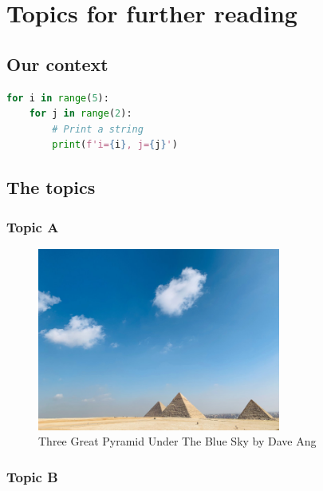 \chapter{Topics for further reading}



\section{Our context}

\blindtext

\begin{lstlisting}[language=Python, caption={Nested for loop in Python}, captionpos=b]
for i in range(5):
    for j in range(2):
        # Print a string
        print(f'i={i}, j={j}')
\end{lstlisting}

\blindtext



\section{The topics}



\subsection{Topic A}

\blindtext

\begin{figure}[ht]
    \centering
    \includegraphics[width=8cm]{img/dave-ang-pyramid.jpg}
    \caption{Three Great Pyramid Under The Blue Sky by Dave Ang}
    \label{fig:great_pyramid}
\end{figure}

\blindtext



\subsection{Topic B}

